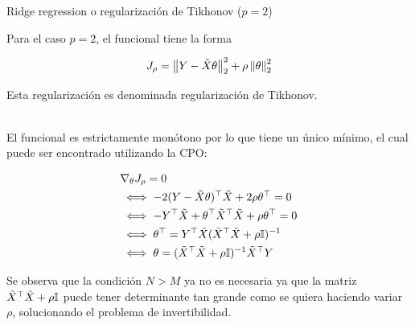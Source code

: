 \documentclass[9pt]{beamer}
\begin{document}
\begin{frame}{Ridge regression o regularización de Tikhonov ($p=2$)}

Para el caso $p=2$, el funcional tiene la forma

\begin{equation*}
	J_\rho = \left\lVert Y-\tilde{X}\theta\right\rVert_2^2 + \rho\left\lVert\theta\right\rVert_2^2
	\label{eq:reg_least_squares}
\end{equation*}

Esta regularización es denominada regularización de Tikhonov.\\~\ \pause

El funcional es estrictamente monótono por lo que tiene un único mínimo, el cual puede ser encontrado utilizando la CPO:

\begin{align*}
	&\nabla_\theta J_\rho = 0\nonumber\\
	&\iff -2(Y-\tilde{X}\theta)^\top\tilde{X} + 2\rho\theta^\top =0\nonumber\\
	&\iff -Y^\top\tilde{X} +\theta^\top\tilde{X}^\top\tilde{X} + \rho\theta^\top= 0\nonumber\\
	&\iff \theta^\top = Y^\top \tilde{X}(\tilde{X}^\top\tilde{X} + \rho{\mathbb I})^{-1}\nonumber\\
	&\iff \theta = (\tilde{X}^\top\tilde{X}+\rho{\mathbb I})^{-1}\tilde{X}^\top Y
\end{align*}\pause
	
Se observa que la condición $N>M$ ya no es necesaria ya que la matriz $\tilde{X}^\top\tilde{X}+\rho{\mathbb I}$ puede tener determinante tan grande como se quiera haciendo variar $\rho$, solucionando el problema de invertibilidad.	
	
\end{frame}
\end{document}
